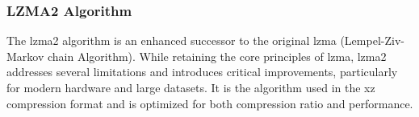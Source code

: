 


    \subsubsection{LZMA2 Algorithm}
    The \gls{lzma}2 algorithm is an enhanced successor to the original \gls{lzma} (Lempel-Ziv-Markov chain Algorithm). While retaining the core principles of \gls{lzma}, \gls{lzma}2 addresses several limitations and introduces critical improvements, particularly for modern hardware and large datasets. It is the algorithm used in the xz compression format and is optimized for both compression ratio and performance.
    
